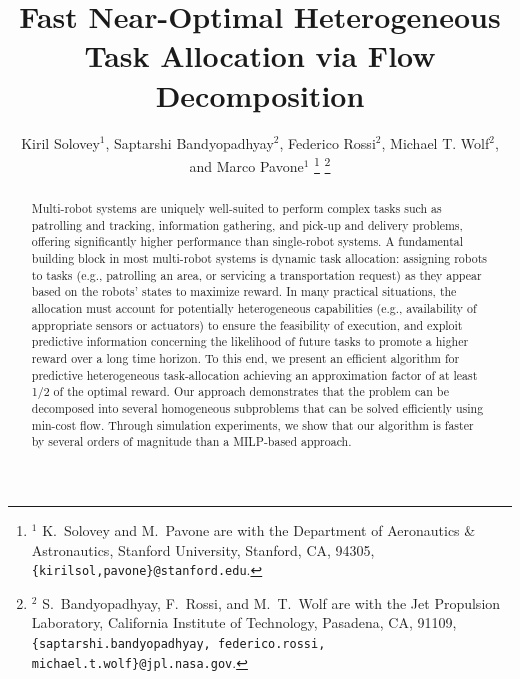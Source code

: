 \documentclass[conference]{IEEEtran}
\title{Fast Near-Optimal Heterogeneous Task Allocation via Flow Decomposition}
\author{Kiril Solovey$^1$, Saptarshi Bandyopadhyay$^2$,  Federico Rossi$^2$, Michael T. Wolf$^2$, and Marco Pavone$^1$
\thanks{$^1$ K.\ Solovey and M.\ Pavone are with the Department of Aeronautics \& Astronautics, Stanford University, Stanford, CA, 94305, {\tt \{kirilsol,pavone\}@stanford.edu}.}
\thanks{$^2$ S.\ Bandyopadhyay, F.\ Rossi, and M.\ T.\ Wolf are with the Jet Propulsion Laboratory, California Institute of Technology, Pasadena, CA, 91109, {\tt \{saptarshi.bandyopadhyay, federico.rossi, michael.t.wolf\}@jpl.nasa.gov}.}}
\begin{document}
\maketitle

\begin{abstract}
Multi-robot systems are uniquely well-suited to perform complex tasks such as patrolling and tracking, information gathering, and pick-up and delivery problems, offering significantly higher performance than single-robot systems. A fundamental building block in most multi-robot systems is dynamic task allocation: assigning robots to tasks (e.g., patrolling an area, or servicing a transportation request) as they appear based on the robots' states to maximize reward. In many practical situations, the allocation must account for potentially heterogeneous capabilities (e.g., availability of appropriate sensors or actuators) to ensure the feasibility of execution, and exploit predictive information concerning the likelihood of future tasks to promote a higher reward over a long time horizon. To this end, we present an efficient algorithm for predictive heterogeneous task-allocation achieving an approximation factor of at least 1/2 of the optimal reward. Our approach demonstrates that the problem can be decomposed into several homogeneous subproblems that can be solved efficiently using min-cost flow. Through simulation experiments, we show that our algorithm is faster by several orders of magnitude than a MILP-based approach.
\end{abstract}
\end{document}

